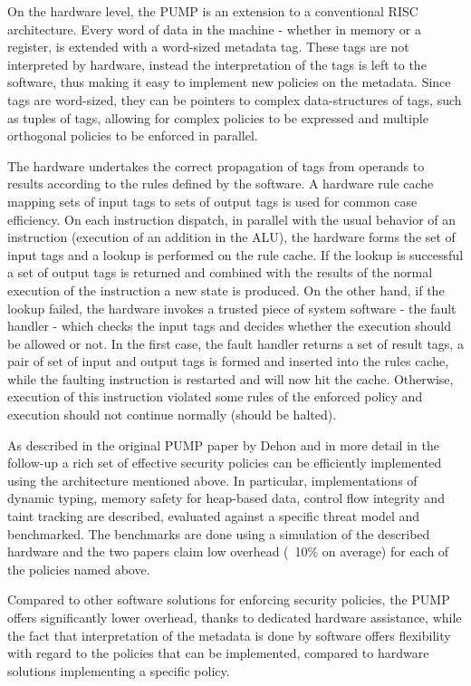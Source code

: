 On the hardware level, the PUMP is an extension to a conventional RISC 
architecture. Every word of data in the machine - whether in memory 
or a register, is extended with a word-sized metadata tag.
These tags are not interpreted by hardware, instead the interpretation of the 
tags is left to the software, thus making it easy to implement new policies on 
the metadata. Since tags are word-sized, they can be pointers to complex 
data-structures of tags, such as tuples of tags, allowing for complex policies 
to be expressed and multiple orthogonal policies to be enforced in parallel.

The hardware undertakes the correct propagation of tags from operands to results 
according to the rules defined by the software. 
A hardware rule cache mapping sets of input tags to sets of output tags is used 
for common case efficiency. On each instruction dispatch, in parallel 
with the usual behavior of an instruction 
(\EG execution of an addition in the ALU), the hardware forms the set of input 
tags and a lookup is performed on the rule cache. If the lookup is successful
a set of output tags is returned and combined with the results of the normal 
execution of the  instruction a new state is produced. On the other hand, 
if the lookup failed, the hardware invokes a trusted piece of system software - 
the fault handler - which checks the input tags and decides whether the 
execution should be allowed or not. In the first case, the fault handler returns
a set of result tags, a pair of set of input and output tags is formed and
inserted into the rules cache, while the faulting instruction is restarted 
and will now hit the cache. Otherwise, execution of this instruction violated 
some rules of the enforced policy and execution should not continue normally 
(\EG should be halted).

As described in the original PUMP paper by Dehon \ETAL \cite{pump_hasp2014} and 
in more detail in the follow-up \cite{pump_ccs2014} a rich set of effective 
security policies can be efficiently implemented using the architecture 
mentioned above. In particular, implementations of dynamic typing, memory safety
for heap-based data, control flow integrity and taint tracking are described, 
evaluated against a specific threat model and benchmarked. The benchmarks are
done using a simulation of the described hardware and the two papers claim low
overhead (~10\% on average) for each of the policies named above.

Compared to other software solutions for enforcing security policies, the PUMP 
offers  significantly lower overhead, thanks to dedicated hardware assistance, 
while the fact that interpretation of the metadata is done by software offers 
flexibility with regard to the policies that can be implemented, compared to 
hardware solutions implementing a specific policy.

